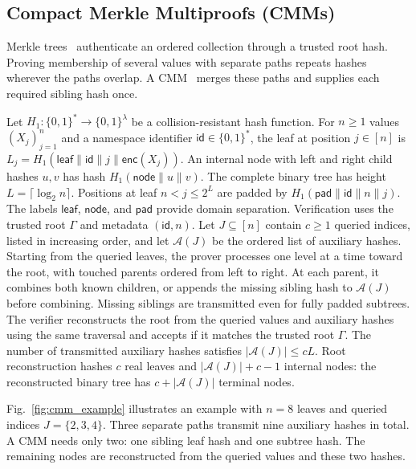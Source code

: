 \documentclass[lettersize,journal]{IEEEtran}
\begin{document}
\subsection{Compact Merkle Multiproofs (CMMs)}
\label{subsec:multiproofs}
Merkle trees~\cite{Merkle1988} authenticate an ordered collection through a trusted root hash. Proving membership of several values with separate paths repeats hashes wherever the paths overlap. A CMM~\cite{Ramabaja2020Compact} merges these paths and supplies each required sibling hash once. 

Let $H_1:\{0,1\}^*\to\{0,1\}^{\lambda}$ be a collision-resistant hash function. For $n\geq1$ values $(X_j)_{j=1}^n$ and a namespace identifier $\mathsf{id}\in\{0,1\}^*$, the leaf at position $j\in[n]$ is $L_j=H_1(\mathsf{leaf}\|\mathsf{id}\|j\|\mathsf{enc}(X_j)).$
An internal node with left and right child hashes $u,v$ has hash $H_1(\mathsf{node}\|u\|v)$. The complete binary tree has height $L=\lceil\log_2 n\rceil$. Positions at leaf $n<j\leq2^L$ are padded by $H_1(\mathsf{pad}\|\mathsf{id}\|n\|j)$. The labels $\mathsf{leaf}$, $\mathsf{node}$, and $\mathsf{pad}$ provide domain separation. Verification uses the trusted root $\Gamma$ and metadata $(\mathsf{id},n)$.
Let $J\subseteq[n]$ contain $c\geq1$ queried indices, listed in increasing order, and let $\mathcal A(J)$ be the ordered list of auxiliary hashes. Starting from the queried leaves, the prover processes one level at a time toward the root, with touched parents ordered from left to right. At each parent, it combines both known children, or appends the missing sibling hash to $\mathcal A(J)$ before combining. Missing siblings are transmitted even for fully padded subtrees. The verifier reconstructs the root from the queried values and auxiliary hashes using the same traversal and accepts if it matches the trusted root $\Gamma$.
The number of transmitted auxiliary hashes satisfies $|\mathcal A(J)|\leq cL$.
Root reconstruction hashes $c$ real leaves and $|\mathcal A(J)|+c-1$ internal nodes: the reconstructed binary tree has $c+|\mathcal A(J)|$ terminal nodes.

Fig.~\ref{fig:cmm_example} illustrates an example with $n=8$ leaves and queried indices $J=\{2,3,4\}$. Three separate paths transmit nine auxiliary hashes in total. A CMM needs only two: one sibling leaf hash and one subtree hash. The remaining nodes are reconstructed from the queried values and these two hashes.
\end{document}
